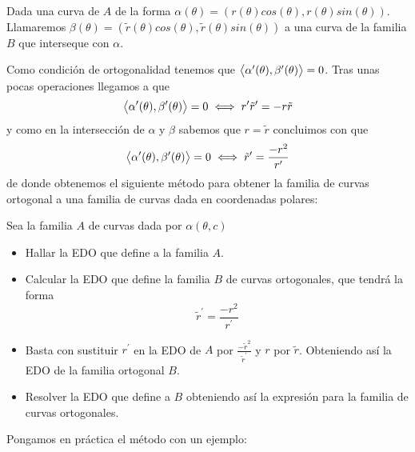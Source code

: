 Dada una curva de $A$ de la forma $\alpha(\theta) = (r(\theta)cos(\theta), r(\theta)sin(\theta))$. Llamaremos $\beta(\theta) = (\tilde{r}(\theta)cos(\theta), \tilde{r}(\theta)sin(\theta))$ a una curva de la familia $B$ que interseque con $\alpha$.

Como condición de ortogonalidad tenemos que $\left\langle \alpha^\prime(\theta),\beta^\prime(\theta)\right\rangle = 0$.
Tras unas pocas operaciones llegamos a que $$\left\langle \alpha^\prime(\theta),\beta^\prime(\theta)\right\rangle = 0 \iff r^\prime \tilde{r}^\prime = -r\tilde{r}$$ y como en la intersección de $\alpha$ y $\beta$ sabemos que $r = \tilde{r}$ concluimos con que $$\left\langle \alpha^\prime(\theta),\beta^\prime(\theta)\right\rangle = 0 \iff \tilde{r}^\prime = \frac{-r^2}{r^\prime}$$ de donde obtenemos el siguiente método para obtener la familia de curvas ortogonal a una familia de curvas dada en coordenadas polares:

\begin{method}
Sea la familia $A$ de curvas dada por $\alpha(\theta, c)$
\begin{itemize}
\item Hallar la EDO que define a la familia $A$.
\item Calcular la EDO que define la familia $B$ de curvas ortogonales, que tendrá la forma $$ \tilde{r}^\prime = \frac{-r^2}{r^\prime}$$
\item Basta con sustituir $r^\prime$ en la EDO de $A$ por $\frac{-\tilde{r}^2}{\tilde{r}^\prime}$ y $r$ por $\tilde{r}$. Obteniendo así la EDO de la familia ortogonal $B$.
\item Resolver la EDO que define a $B$ obteniendo así la expresión para la familia de curvas ortogonales.
\end{itemize}
\end{method}

Pongamos en práctica el método con un ejemplo:


